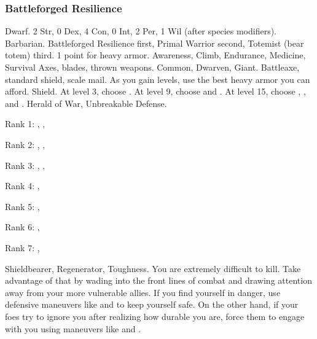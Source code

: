         \subsubsection{Battleforged Resilience}
             Dwarf.
             2 Str, 0 Dex, 4 Con, 0 Int, 2 Per, 1 Wil (after species modifiers).
             Barbarian.
             Battleforged Resilience first, Primal Warrior second, Totemist (bear totem) third.
             1 point for heavy armor.
             Awareness, Climb, Endurance, Medicine, Survival
             Axes, blades, thrown weapons.
             Common, Dwarven, Giant.
             Battleaxe, standard shield, scale mail. As you gain levels, use the best heavy armor you can afford.
             Shield.
                At level 3, choose .
                At level 9, choose  and .
                At level 15, choose , , and .
             Herald of War, Unbreakable Defense.
            \begin{raggeditemize}
                \item Rank 1: , , 
                \item Rank 2: , , 
                \item Rank 3: , , 
                \item Rank 4: , 
                \item Rank 5: , 
                \item Rank 6: , 
                \item Rank 7: , 
            \end{raggeditemize}
             Shieldbearer, Regenerator, Toughness.
             You are extremely difficult to kill.
            Take advantage of that by wading into the front lines of combat and drawing attention away from your more vulnerable allies.
            If you find yourself in danger, use defensive maneuvers like  and  to keep yourself safe.
            On the other hand, if your foes try to ignore you after realizing how durable you are, force them to engage with you using maneuvers like  and .

